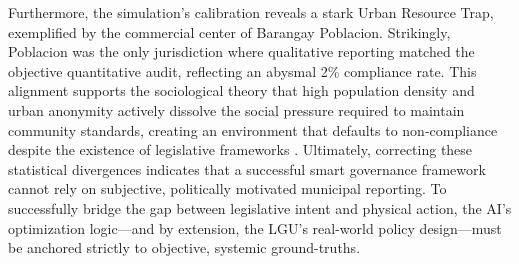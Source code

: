 Furthermore, the simulation's calibration reveals a stark Urban Resource Trap, exemplified by the commercial center of Barangay Poblacion. Strikingly, Poblacion was the only jurisdiction where qualitative reporting matched the objective quantitative audit, reflecting an abysmal 2\% compliance rate. This alignment supports the sociological theory that high population density and urban anonymity actively dissolve the social pressure required to maintain community standards, creating an environment that defaults to non-compliance despite the existence of legislative frameworks \citep{Yazawa2025}. Ultimately, correcting these statistical divergences indicates that a successful smart governance framework cannot rely on subjective, politically motivated municipal reporting. To successfully bridge the gap between legislative intent and physical action, the AI's optimization logic—and by extension, the LGU's real-world policy design—must be anchored strictly to objective, systemic ground-truths.